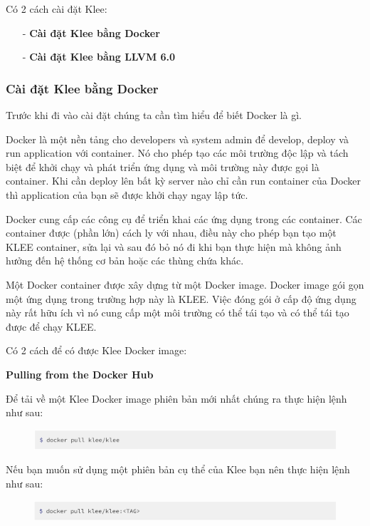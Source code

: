 \documentclass[12pt,a4paper]{article}
\begin{document}
Có 2 cách cài đặt Klee:
\begin{itemize}
\item[-] \textbf{Cài đặt Klee bằng Docker}
\item[-] \textbf{Cài đặt Klee bằng LLVM 6.0}
\end{itemize}

\subsubsection{Cài đặt Klee bằng Docker}
Trước khi đi vào cài đặt chúng ta cần tìm hiểu để biết Docker là gì.

Docker là một nền tảng cho developers và system admin để develop, deploy và run application với container. Nó cho phép tạo các môi trường độc lập và tách biệt để khởi chạy và phát triển ứng dụng và môi trường này được gọi là container. Khi cần deploy lên bất kỳ server nào chỉ cần run container của Docker thì application của bạn sẽ được khởi chạy ngay lập tức.

Docker cung cấp các công cụ để triển khai các ứng dụng trong các container. Các container được (phần lớn) cách ly với nhau, điều này cho phép bạn tạo một KLEE container, sửa lại và sau đó bỏ nó đi khi bạn thực hiện mà không ảnh hưởng đến hệ thống cơ bản hoặc các thùng chứa khác.

Một Docker container được xây dựng từ một Docker image. Docker image gói gọn một ứng dụng trong trường hợp này là KLEE. Việc đóng gói ở cấp độ ứng dụng này rất hữu ích vì nó cung cấp một môi trường có thể tái tạo và có thể tái tạo được để chạy KLEE.

Có 2 cách để có được Klee Docker image:

\textbf{Pulling from the Docker Hub}

Để tải về một Klee Docker image phiên bản mới nhất chúng ra thực hiện lệnh như sau:

\begin{figure}[ht]
\begin{center}
\includegraphics[scale=.3]{hinhanh/pulldocker.png}
\end{center}
\end{figure}

Nếu bạn muốn sử dụng một phiên bản cụ thể của Klee bạn nên thực hiện lệnh như sau:

\begin{figure}[ht]
\begin{center}
\includegraphics[scale=.3]{hinhanh/pulldockertag.png}
\end{center}
\end{figure}
\end{document}
